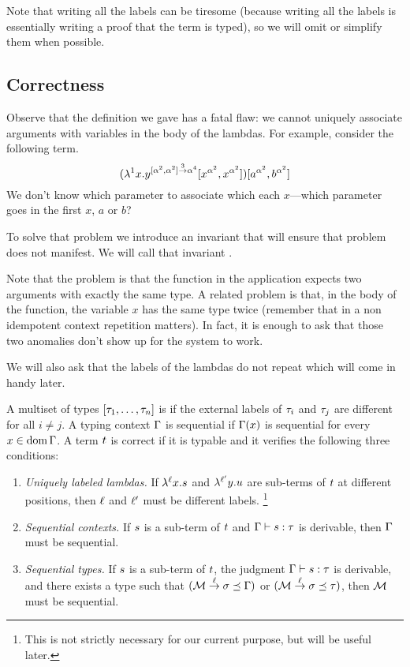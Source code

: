 Note that writing all the labels can be tiresome
(because writing all the labels is essentially writing a proof that the term is typed),
so we will omit or simplify them when possible.

\subsection*{Correctness}
Observe that the definition we gave has a fatal flaw:
we cannot uniquely associate arguments with variables in the body of the lambdas.
For example, consider the following term.
\[(\lambda^{1} x. y^{[\alpha^2, \alpha^2] \overset{3}{\to} \alpha^4} [x^{\alpha^2}, x^{\alpha^2}])
[a^{\alpha^2}, b^{\alpha^2}]\]
We don't know which parameter to associate which each $x$---which parameter goes in the first $x$, $a$ or $b$?

To solve that problem we introduce an invariant that will ensure
that problem does not manifest.
We will call that invariant .

Note that the problem is that the function in the application expects two arguments
with exactly the same type. A related problem is that, in the body of the function,
the variable $x$ has the same type twice (remember that in a non idempotent context repetition matters).
In fact, it is enough to ask that those two anomalies don't show up for the system to work.

We will also ask that the labels of the lambdas do not repeat which
will come in handy later.

\begin{definition}
A multiset of types $[\tau_1,\hdots,\tau_n]$ is 
if the external labels of $\tau_i$ and $\tau_j$ are different for all $i \neq j$.
A typing context $\Gamma$ is sequential if $\Gamma(x)$ is sequential for every $x \in \operatorname{dom}\Gamma$.
A term $t$ is correct if it is typable and it verifies the following three conditions:
\begin{enumerate}
\item {\em Uniquely labeled lambdas.}
  If $\lambda^{\ell} x. s$ and $\lambda^{\ell'} y. u$
  are sub-terms of $t$ at different positions, then $\ell$ and $\ell'$
  must be different labels.
  \footnote{This is not strictly necessary for our current purpose, but will be useful later.}
\item {\em Sequential contexts.}
  If $s$ is a sub-term of $t$ and $\Gamma \vdash s : \tau$
  is derivable, then $\Gamma$ must be sequential.
\item {\em Sequential types.}
  If $s$ is a sub-term of $t$,
  the judgment $\Gamma \vdash s : \tau$ is derivable,
  and there exists a type such that
  $(\mathcal{M} \overset{\ell}{\to} \sigma \preceq \Gamma)$ or $(\mathcal{M} \overset{\ell}{\to} \sigma \preceq \tau)$,
  then $\mathcal{M}$ must be sequential.
\end{enumerate}
\end{definition}

